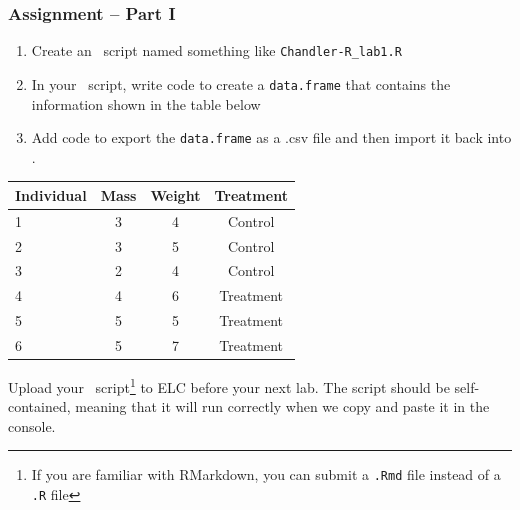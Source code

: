 \documentclass[color=usenames,dvipsnames]{beamer}\usepackage[]{graphicx}\usepackage[]{color}
\begin{document}
\begin{frame}[fragile]
  \frametitle{Assignment -- Part I}
  \footnotesize
  \begin{enumerate}[\bf (1)]
    \item Create an \R~script named something like \verb+Chandler-R_lab1.R+
    \item In your \R~script, write code to create a \verb+data.frame+
      that contains the information shown in the table below
    \item Add code to export the \verb+data.frame+ as a .csv file and
      then import it back into \R.
  \end{enumerate}
  \begin{center}
    \scriptsize
    \begin{tabular}{lccc}
      \hline
      Individual & Mass & Weight & Treatment \\
      \hline
      1 & 3 & 4 & Control \\
      2 & 3 & 5 & Control \\
      3 & 2 & 4 & Control \\
      4 & 4 & 6 & Treatment \\
      5 & 5 & 5 & Treatment \\
      6 & 5 & 7 & Treatment \\
      \hline
    \end{tabular}
  \end{center}
  Upload your \R~script\footnote{\scriptsize \noindent If you
    are familiar with RMarkdown, you can submit a \texttt{.Rmd} file
    instead of a \texttt{.R} file} to ELC before your next lab. The script should
  be self-contained, meaning that it will run correctly when we copy
  and paste it in the console.
\end{frame}
\end{document}
